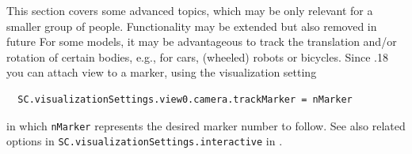 %
This section covers some advanced topics, which may be only relevant for a smaller group of people. 
Functionality may be extended but also removed in future
%
%
For some models, it may be advantageous to track the translation and/or rotation of certain bodies, e.g., for cars, (wheeled) robots or bicycles. 
Since .18 you can attach view to a marker, using the visualization setting
\pythonstyle\begin{lstlisting}
  SC.visualizationSettings.view0.camera.trackMarker = nMarker
\end{lstlisting}
in which \texttt{nMarker} represents the desired marker number to follow.
See also related options in \texttt{SC.visualizationSettings.interactive} in .

